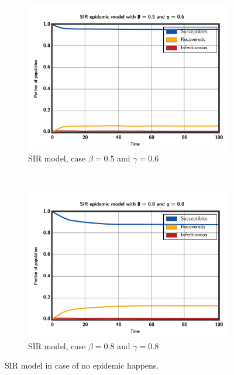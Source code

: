 \documentclass[a4paper,12pt]{article}
\begin{document}
\begin{figure}[h!]
  \centering
  \begin{subfigure}[b]{0.45\textwidth}
    \includegraphics[width=\textwidth]{noepidemic1}
    \caption{SIR model, case $\beta = 0.5$ and $\gamma = 0.6$}
  \end{subfigure}
~
\begin{subfigure}[b]{0.45\textwidth}
    \includegraphics[width=\textwidth]{noepidemic2}
    \caption{SIR model, case $\beta = 0.8$ and $\gamma = 0.8$}
  \end{subfigure}
  \caption{SIR model in case of no epidemic happens.}
\end{figure}


\end{document}
